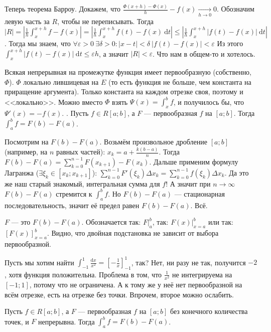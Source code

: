 \documentclass{article}
\begin{document}
\begin{itemize}
\begin{Proof}
            Теперь теорема Барроу. Докажем, что $\frac{\Phi(x+h)-\Phi(x)}h-f(x)\underset{h\to0}\longrightarrow0$. Обозначим левую часть за $R$, чтобы не переписывать. Тогда $|R|=\left|\frac1h\int_x^{x+h}f-f(x)\right|=\left|\frac1h\int_x^{x+h}f(t)-f(x)~\mathrm dt\right|\leqslant\left|\frac1h\int_x^{x+h}|f(t)-f(x)|~\mathrm dt\right|$. Тогда мы знаем, что $\forall\varepsilon>0~\exists\delta>0:|x-t|<\delta~|f(t)-f(x)|<\varepsilon$ Из этого $\int_x^{x+h}|f(t)-f(x)|~\mathrm dt\leqslant\varepsilon h$, а значит $|R|<\varepsilon$. Что нам в общем-то и хотелось.
        \end{Proof}
        \thm Всякая непрерывная на промежутке функция имеет первообразную (собственно, $\Phi$).
        \thm $\Phi$ локально лившицевая на $E$ (то есть функция не больше, чем константа на приращение аргумента). Только константа на каждом отрезке своя, поэтому и <<локально>>.
        \thm Можно вместо $\Phi$ взять $\Psi(x)=\int_x^bf$, и получилось бы, что $\Psi'(x)=-f(x)$.
        \thm {}. Пусть $f\in R[a;b]$, а $F$ --- первообразная $f$ на $[a;b]$. Тогда $\int_a^bf=F(b)-F(a)$.
        \begin{Proof}
            Посмотрим на $F(b)-F(a)$. Возьмём произвольное дробление $[a;b]$ (например, на $n$ равных частей): $x_k=a+\frac{k(b-a)}n$. Тогда $F(b)-F(a)=\sum\limits_{k=0}^{n-1}F(x_{k+1})-F(x_k)$. Дальше применим формулу Лагранжа ($\exists\xi_k\in[x_k;x_{k+1}]$): $\sum\limits_{k=0}^{n-1}F'(\xi_k)\Delta x_k=\sum\limits_{k=0}^{n-1}f(\xi_k)\Delta x_k$. Да это же наш старый знакомый, интегральная сумма для $f$! А значит при $n\to\infty$ $F(b)-F(a)$ стремится к $\int_a^bf$. Но $F(b)-F(a)$ --- стационарная последовательность, значит её предел равен $F(b)-F(a)$. Всё.
        \end{Proof}
        \dfn {} $F$ --- это $F(b)-F(a)$. Обозначается так: $F\big|_a^b$, так: $F(x)\big|_{x=a}^b$ или так: $[F(x)]_{x=a}^b$.
        \thm Видно, что двойная подстановка не зависит от выбора первообразной.
        \begin{Comment}
            Пусть мы хотим найти $\int_{-1}^1\frac{\mathrm dx}{x^2}=\left[-\frac1x\right]_{-1}^1$, так? Нет, ни разу не так, получится $-2$, хотя функция положительна. Проблема в том, что $\frac1{x^2}$ не интегрируема на $[-1;1]$, потому что не ограничена. А к тому же у неё нет первообразной на всём отрезке, есть на отрезке без точки. Впрочем, второе можно ослабить.
        \end{Comment}
        \thm Пусть $f\in R[a;b]$, а $F$ --- первообразная $f$ на $[a;b]$ без конечного количества точек, и $F$ непрерывна. Тогда $\int_a^bf=F(b)-F(a)$.

\end{itemize}
\end{document}
